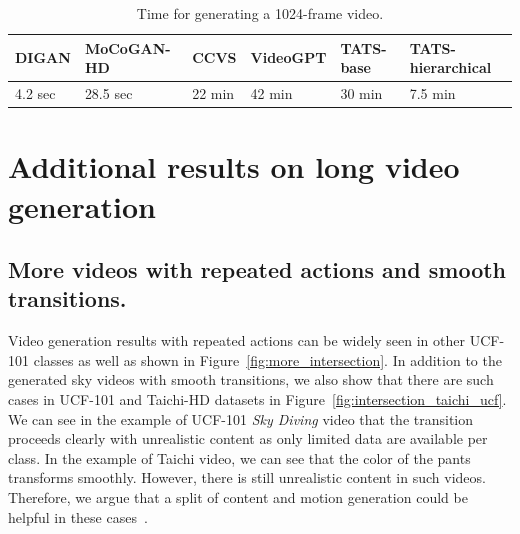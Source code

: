 
\begin{table}[h]
\centering
\caption{Time for generating a 1024-frame video.}
\addtolength{\tabcolsep}{3.5pt}
\label{tab:inference_time}
\begin{tabular}{llllll}
\toprule
DIGAN & MoCoGAN-HD & CCVS & VideoGPT & TATS-base & TATS-hierarchical \\
\midrule
4.2 sec  & 28.5 sec  &22 min & 42 min & 30 min & 7.5 min \\
\bottomrule
\end{tabular}
\end{table}

\section{Additional results on long video generation}

\subsection{More videos with repeated actions and smooth transitions.}
Video generation results with repeated actions can be widely seen in other UCF-101 classes as well as shown in Figure~\ref{fig:more_intersection}. 
In addition to the generated sky videos with smooth transitions, we also show that there are such cases in UCF-101 and Taichi-HD datasets in Figure~\ref{fig:intersection_taichi_ucf}. 
We can see in the example of UCF-101 \textit{Sky Diving} video that the transition proceeds clearly with unrealistic content as only limited data are available per class. 
In the example of Taichi video, we can see that the color of the pants transforms smoothly. 
However, there is still unrealistic content in such videos. Therefore, we argue that a split of content and motion generation could be helpful in these cases~\cite {Tulyakov_2018_CVPR,yu2021generating,tian2021a}.

